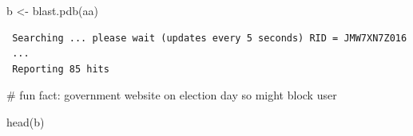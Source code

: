 \documentclass[
  letterpaper,
  DIV=11,
  numbers=noendperiod]{scrartcl}
\newenvironment{Shaded}{\begin{snugshade}}{\end{snugshade}}
\newcommand{\CommentTok}[1]{\textcolor[rgb]{0.37,0.37,0.37}{#1}}
\newcommand{\FunctionTok}[1]{\textcolor[rgb]{0.28,0.35,0.67}{#1}}
\newcommand{\NormalTok}[1]{\textcolor[rgb]{0.00,0.23,0.31}{#1}}
\newcommand{\OtherTok}[1]{\textcolor[rgb]{0.00,0.23,0.31}{#1}}
\begin{document}
\begin{Shaded}
\begin{Highlighting}[]
\NormalTok{b }\OtherTok{\textless{}{-}} \FunctionTok{blast.pdb}\NormalTok{(aa)}
\end{Highlighting}
\end{Shaded}

\begin{verbatim}
 Searching ... please wait (updates every 5 seconds) RID = JMW7XN7Z016 
 ...
 Reporting 85 hits
\end{verbatim}

\begin{Shaded}
\begin{Highlighting}[]
\CommentTok{\# fun fact: government website on election day so might block user}
\end{Highlighting}
\end{Shaded}

\begin{Shaded}
\begin{Highlighting}[]
\FunctionTok{head}\NormalTok{(b)}
\end{Highlighting}
\end{Shaded}
\end{document}
